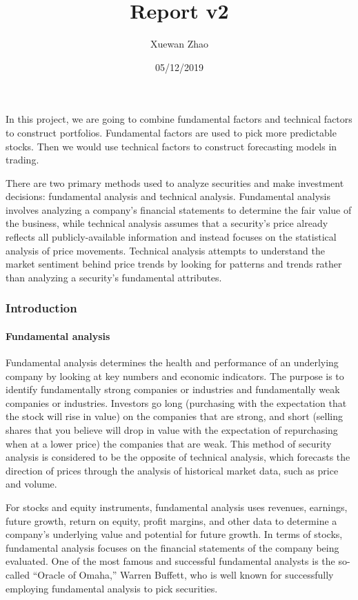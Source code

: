 \documentclass[]{article}
\title{Report v2}
\author{Xuewan Zhao}
\date{05/12/2019}
\let\oldparagraph\paragraph
\renewcommand{\paragraph}[1]{\oldparagraph{#1}\mbox{}}
\begin{document}
\maketitle

In this project, we are going to combine fundamental factors and
technical factors to construct portfolios. Fundamental factors are used
to pick more predictable stocks. Then we would use technical factors to
construct forecasting models in trading.

There are two primary methods used to analyze securities and make
investment decisions: fundamental analysis and technical analysis.
Fundamental analysis involves analyzing a company's financial statements
to determine the fair value of the business, while technical analysis
assumes that a security's price already reflects all publicly-available
information and instead focuses on the statistical analysis of price
movements. Technical analysis attempts to understand the market
sentiment behind price trends by looking for patterns and trends rather
than analyzing a security's fundamental attributes.

\hypertarget{introduction}{%
\subsubsection{Introduction}\label{introduction}}

\hypertarget{fundamental-analysis}{%
\paragraph{Fundamental analysis}\label{fundamental-analysis}}

Fundamental analysis determines the health and performance of an
underlying company by looking at key numbers and economic indicators.
The purpose is to identify fundamentally strong companies or industries
and fundamentally weak companies or industries. Investors go long
(purchasing with the expectation that the stock will rise in value) on
the companies that are strong, and short (selling shares that you
believe will drop in value with the expectation of repurchasing when at
a lower price) the companies that are weak. This method of security
analysis is considered to be the opposite of technical analysis, which
forecasts the direction of prices through the analysis of historical
market data, such as price and volume.

For stocks and equity instruments, fundamental analysis uses revenues,
earnings, future growth, return on equity, profit margins, and other
data to determine a company's underlying value and potential for future
growth. In terms of stocks, fundamental analysis focuses on the
financial statements of the company being evaluated. One of the most
famous and successful fundamental analysts is the so-called ``Oracle of
Omaha,'' Warren Buffett, who is well known for successfully employing
fundamental analysis to pick securities.
\end{document}
